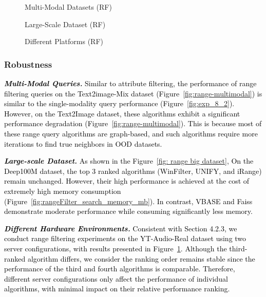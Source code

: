 \documentclass[sigconf, nonacm, pdfa]{acmart}
\begin{document}
{\begin{figure}
	\centering
	\begin{minipage}[t]{0.37\textwidth}
		\centering
		\setlength{\abovecaptionskip}{-0.2cm}
		\caption{Multi-Modal Datasets (RF)}
		\label{fig:range-multimodal} 
	\end{minipage}%
	\hfill
	\begin{minipage}[t]{0.27\textwidth}
		\centering
		\setlength{\abovecaptionskip}{-0.2cm}
		\caption{Large-Scale Dataset (RF)}
		\label{fig: range big dataset}
	\end{minipage}
	\hfill %
	\begin{minipage}[t]{0.35\textwidth}
		\centering
		\setlength{\abovecaptionskip}{-0.2cm}
		\caption{Different Platforms (RF)}
		\label{fig:range-cross-platform}
	\end{minipage}%
	
\end{figure}
	
	\subsubsection{Robustness}
	
	\textit{\textbf{\textcolor{black}{Multi-Modal Queries.}}}
	\textcolor{black}{
		Similar to attribute filtering, the performance of range filtering queries on the Text2image-Mix dataset (Figure~\ref{fig:range-multimodal}) is similar to the single-modality query performance (Figure~\ref{fig:exp_8_2}). However, on the Text2Image dataset, these algorithms exhibit a significant performance degradation (Figure~\ref{fig:range-multimodal}). This is because most of these range query algorithms are graph-based, and such algorithms require more iterations to find true neighbors in OOD datasets.
		}
		
	\textit{\textbf{\textcolor{black}{Large-scale Dataset.}}} \textcolor{black}{As shown in the Figure~\ref{fig: range big dataset}, On the Deep100M dataset, the top 3 ranked algorithms (WinFilter, UNIFY, and iRange) remain unchanged. However, their high performance is achieved at the cost of extremely high memory consumption (Figure~\ref{fig:rangeFilter_search_memory_mb}). In contrast, VBASE and Faiss demonstrate moderate performance while consuming significantly less memory.}
		
	\textit{\textbf{\textcolor{black}{Different Hardware Environments.}}} 
	\textcolor{black}{Consistent with Section 4.2.3, we conduct range filtering experiments on the YT-Audio-Real dataset using two server configurations, with results presented in Figure~\ref{fig:range-cross-platform}. Although the third-ranked algorithm differs, we consider the ranking order remains stable since the performance of the third and fourth algorithms is comparable. Therefore, different server configurations only affect the performance of individual algorithms, with minimal impact on their relative performance ranking.}  


}
\end{document}
